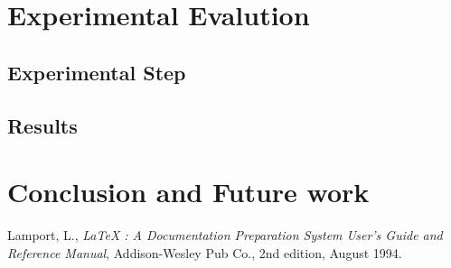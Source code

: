 \documentclass[11pt]{article}
\begin{document}
\section{Experimental Evalution}\newline
\label{Experimental Evalution}\newline


\subsection{Experimental Step}
\label{Experimental Step}

\subsection{Results}
\label{Results}


\section{Conclusion and Future work}
\label{Conclusion and Future work} 



\begin{thebibliography}{99}
 Lamport, L., {\it LaTeX : A Documentation
 Preparation System User's Guide and Reference Manual}, Addison-Wesley 
 Pub Co., 2nd edition, August 1994.
\end{thebibliography}
 
\end{document}
